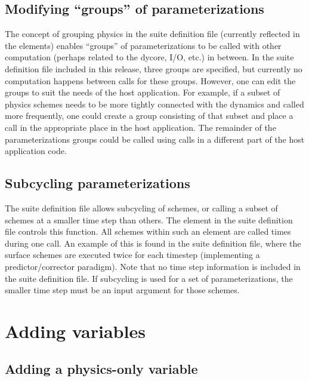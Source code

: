 \subsection{Modifying ``groups'' of parameterizations}

The concept of grouping physics in the suite definition file (currently reflected in the  elements) enables ``groups'' of parameterizations to be called with other computation (perhaps related to the dycore, I/O, etc.) in between. In the suite definition file included in this release, three groups are specified, but currently no computation happens between  calls for these groups. However, one can edit the groups to suit the needs of the host application. For example, if a subset of physics schemes needs to be more tightly connected with the dynamics and called more frequently, one could create a group consisting of that subset and place a  call in the appropriate place in the host application. The remainder of the parameterizations groups could be called using  calls in a different part of the host application code.

\subsection{Subcycling parameterizations}

The suite definition file allows subcycling of schemes, or calling a subset of schemes at a smaller time step than others. The \execout{>} element in the suite definition file controls this function. All schemes within such an element are called  times during one  call. An example of this is found in the  suite definition file, where the surface schemes are executed twice for each timestep (implementing a predictor/corrector paradigm). Note that no time step information is included in the suite definition file. If subcycling is used for a set of parameterizations, the smaller time step must be an input argument for those schemes.

\section{Adding variables}

\subsection{Adding a physics-only variable} \label{adding_physics_only_variable}

